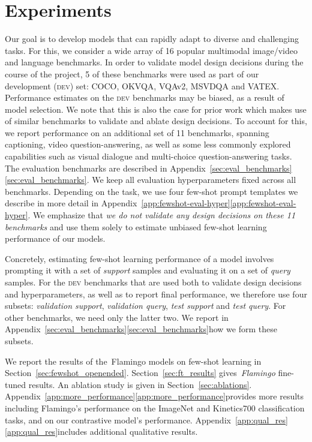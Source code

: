 \section{Experiments}
\label{sec:experiments}

Our goal is to develop models that can rapidly adapt to diverse and challenging tasks. For this, we consider a wide array of 16 popular multimodal image/video and language benchmarks. In order to validate model design decisions during the course of the project, 5 of these benchmarks were used as part of our development (\textsc{dev}) set: COCO, OKVQA, VQAv2, MSVDQA and VATEX. Performance estimates on the \textsc{dev} benchmarks may be biased, as a result of model selection. We note that this is also the case for prior work which makes use of similar benchmarks to validate and ablate design decisions. To account for this, we report performance on an additional set of 11 benchmarks, spanning captioning, video question-answering, as well as some less commonly explored capabilities such as visual dialogue and multi-choice question-answering tasks. The evaluation benchmarks are described in Appendix~\ifwithappendix\ref{sec:eval_benchmarks}\else\ref*{sec:eval_benchmarks}\fi.
We keep all evaluation hyperparameters fixed across all benchmarks. Depending on the task, we use four few-shot prompt templates we describe in more detail in 
Appendix~\ifwithappendix\ref{app:fewshot-eval-hyper}\else\ref*{app:fewshot-eval-hyper}\fi.
We emphasize that \emph{we do not validate any design decisions on these 11 benchmarks} and use them solely to estimate unbiased few-shot learning performance of our models.

Concretely, estimating few-shot learning performance of a model involves prompting it with a set of \emph{support} samples and evaluating it on a set of \emph{query} samples. For the \textsc{dev} benchmarks that are used both to validate design decisions and hyperparameters, as well as to report final performance, we therefore use four subsets:
\emph{validation support}, \emph{validation query}, \emph{test support} and \emph{test query}. For other benchmarks, we need only the latter two. We report in Appendix~\ifwithappendix\ref{sec:eval_benchmarks}\else\ref*{sec:eval_benchmarks}\fi how we form these subsets.

We report the results of the~Flamingo models on few-shot learning in Section~\ref{sec:fewshot_openended}.
Section~\ref{sec:ft_results} gives~\emph{Flamingo} fine-tuned results. An ablation study is given in Section~\ref{sec:ablations}.
Appendix~\ifwithappendix\ref{app:more_performance}\else\ref*{app:more_performance}\fi provides more results including Flamingo's performance on the ImageNet and Kinetics700 classification tasks, and on our contrastive model's performance.
Appendix~\ifwithappendix\ref{app:qual_res}\else\ref*{app:qual_res}\fi includes additional qualitative results.

